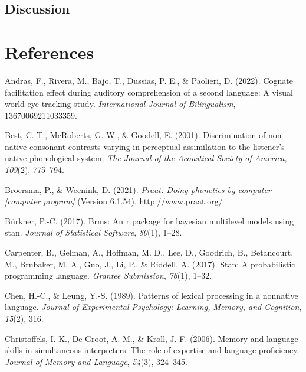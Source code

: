 \documentclass[
]{article}
\newlength{\cslhangindent}
\newenvironment{CSLReferences}[2] %
 {\begin{list}{}{%
  \setlength{\itemindent}{0pt}
  \setlength{\leftmargin}{0pt}
  \setlength{\parsep}{0pt}
  \ifodd #1
   \setlength{\leftmargin}{\cslhangindent}
   \setlength{\itemindent}{-1\cslhangindent}
  \fi
  \setlength{\itemsep}{#2\baselineskip}}}
 {\end{list}}
\begin{document}
\subsection{Discussion}\label{discussion-2}

\section{References}\label{references}

\label{refs}
\begin{CSLReferences}{1}{0}
Andras, F., Rivera, M., Bajo, T., Dussias, P. E., \& Paolieri, D.
(2022). Cognate facilitation effect during auditory comprehension of a
second language: A visual world eye-tracking study. \emph{International
Journal of Bilingualism}, 13670069211033359.

Best, C. T., McRoberts, G. W., \& Goodell, E. (2001). Discrimination of
non-native consonant contrasts varying in perceptual assimilation to the
listener's native phonological system. \emph{The Journal of the
Acoustical Society of America}, \emph{109}(2), 775--794.

Broersma, P., \& Weenink, D. (2021). \emph{Praat: Doing phonetics by
computer {[}computer program{]}} (Version 6.1.54).
\url{http://www.praat.org/}

Bürkner, P.-C. (2017). Brms: An r package for bayesian multilevel models
using stan. \emph{Journal of Statistical Software}, \emph{80}(1), 1--28.

Carpenter, B., Gelman, A., Hoffman, M. D., Lee, D., Goodrich, B.,
Betancourt, M., Brubaker, M. A., Guo, J., Li, P., \& Riddell, A. (2017).
Stan: A probabilistic programming language. \emph{Grantee Submission},
\emph{76}(1), 1--32.

Chen, H.-C., \& Leung, Y.-S. (1989). Patterns of lexical processing in a
nonnative language. \emph{Journal of Experimental Psychology: Learning,
Memory, and Cognition}, \emph{15}(2), 316.

Christoffels, I. K., De Groot, A. M., \& Kroll, J. F. (2006). Memory and
language skills in simultaneous interpreters: The role of expertise and
language proficiency. \emph{Journal of Memory and Language},
\emph{54}(3), 324--345.


\end{CSLReferences}
\end{document}
